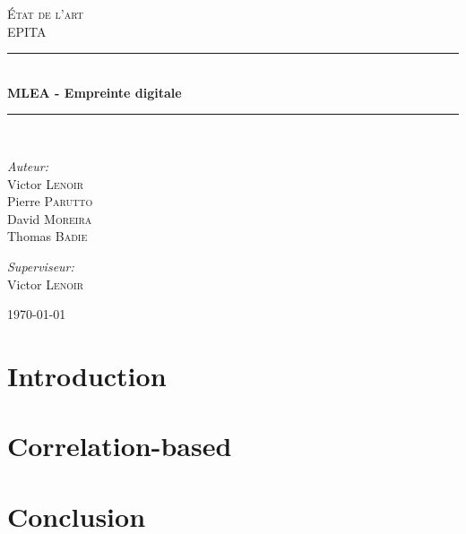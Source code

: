 \documentclass{report}
\newcommand{\HRule}{\rule{\linewidth}{0.5mm}}
\begin{document}
\begin{titlepage}

\begin{center}

\textsc{\LARGE \'Etat de l'art}\\[1.5cm]

\textsc{\Large EPITA}\\[0.5cm]

\HRule \\[0.4cm]
{ \huge \bfseries MLEA - Empreinte digitale}\\[0.4cm]

\HRule \\[1.5cm]

\begin{minipage}{0.4\textwidth}
\begin{flushleft} \large
\emph{Auteur:}\\
Victor \textsc{Lenoir}\\
Pierre \textsc{Parutto}\\
David \textsc{Moreira}\\
Thomas \textsc{Badie}
\end{flushleft}
\end{minipage}
\begin{minipage}{0.4\textwidth}
\begin{flushright} \large
\emph{Superviseur:} \\
Victor \textsc{Lenoir}
\end{flushright}
\end{minipage}

\vfill

{\large \today}

\end{center}

\end{titlepage}
\newpage
\tableofcontents
\newpage

\chapter{Introduction}
\chapter{Correlation-based}
\chapter{Conclusion}
\end{document}
